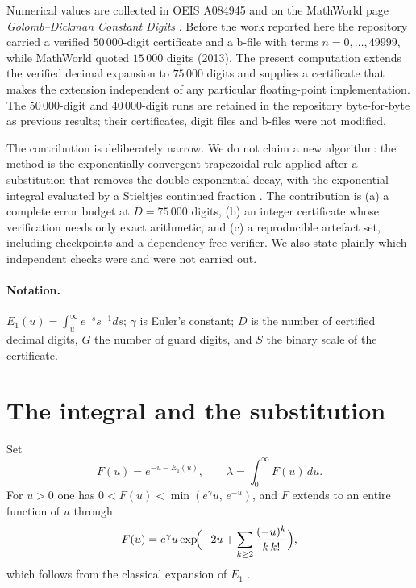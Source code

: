 \documentclass[11pt,a4paper]{article}
\theoremstyle{remark}
\newcommand{\Eone}{E_1}
\newcommand{\lam}{\lambda}
\begin{document}
Numerical values are collected in OEIS A084945 \cite{oeisA084945} and on
the MathWorld page \emph{Golomb--Dickman Constant Digits}
\cite{mathworld}. Before the work reported here the repository carried a
verified $50\,000$-digit certificate and a b-file with terms
$n=0,\ldots,49999$, while MathWorld quoted $15\,000$ digits (2013).
The present computation extends the verified decimal expansion to
$75\,000$ digits and supplies a certificate that makes the extension
independent of any particular floating-point implementation. The
$50\,000$-digit and $40\,000$-digit runs are retained in the repository
byte-for-byte as previous results; their certificates, digit files and
b-files were not modified.

The contribution is deliberately narrow. We do not claim a new algorithm:
the method is the exponentially convergent trapezoidal rule
\cite{TW2014} applied after a substitution that removes the double
exponential decay, with the exponential integral evaluated by a Stieltjes
continued fraction \cite{stieltjes1894}. The contribution is (a) a complete
error budget at $D=75\,000$ digits, (b) an integer certificate whose
verification needs only exact arithmetic, and (c) a reproducible artefact
set, including checkpoints and a dependency-free verifier. We also state
plainly which independent checks were and were not carried out.

\paragraph{Notation.}
$\Eone(u)=\int_u^\infty e^{-s}s^{-1}ds$; $\gamma$ is Euler's constant;
$D$ is the number of certified decimal digits, $G$ the number of guard
digits, and $S$ the binary scale of the certificate.

\section{The integral and the substitution}

Set
\begin{equation}
  F(u)=e^{-u-\Eone(u)},\qquad \lam=\int_0^\infty F(u)\,du .
\end{equation}
For $u>0$ one has $0<F(u)<\min(e^\gamma u,\,e^{-u})$, and $F$ extends to
an entire function of $u$ through
\begin{equation}
  F(u)=e^{\gamma}u\exp\!\Bigl(-2u+\sum_{k\ge2}\frac{(-u)^k}{k\,k!}\Bigr),
  \label{eq:Fseries}
\end{equation}
which follows from the classical expansion of $\Eone$
\cite[5.1.11]{AS1964}.
\end{document}

